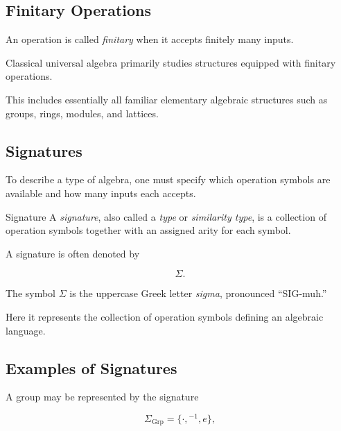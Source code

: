 \subsection{Finitary Operations}
\label{subsec:finitary-operations}

An operation is called \emph{finitary} when it accepts finitely many inputs.

Classical universal algebra primarily studies structures equipped with
finitary operations.

This includes essentially all familiar elementary algebraic structures such
as groups, rings, modules, and lattices.

\subsection{Signatures}
\label{subsec:signatures}

To describe a type of algebra, one must specify which operation symbols are
available and how many inputs each accepts.

\begin{definitionbox}{Signature}
A \emph{signature}, also called a \emph{type} or \emph{similarity type}, is
a collection of operation symbols together with an assigned arity for each
symbol.
\end{definitionbox}

A signature is often denoted by

\[ \Sigma. \]

The symbol \(\Sigma\) is the uppercase Greek letter \emph{sigma},
pronounced ``SIG-muh.''

Here it represents the collection of operation symbols defining an
algebraic language.

\subsection{Examples of Signatures}
\label{subsec:signature-examples}

A group may be represented by the signature

\[ \Sigma_{\mathrm{Grp}}=\{\cdot,{}^{-1},e\}, \]

